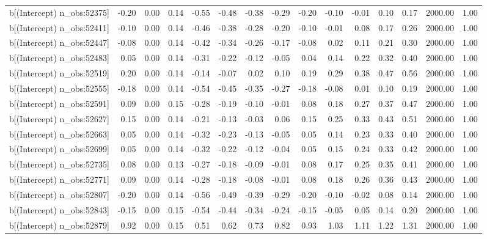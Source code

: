 \begin{table}[ht]
\begin{tabular}{rrrrrrrrrrrrrrr}
  b[(Intercept) n\_obs:52375] & -0.20 & 0.00 & 0.14 & -0.55 & -0.48 & -0.38 & -0.29 & -0.20 & -0.10 & -0.01 & 0.10 & 0.17 & 2000.00 & 1.00 \\ 
  b[(Intercept) n\_obs:52411] & -0.10 & 0.00 & 0.14 & -0.46 & -0.38 & -0.28 & -0.20 & -0.10 & -0.01 & 0.08 & 0.17 & 0.26 & 2000.00 & 1.00 \\ 
  b[(Intercept) n\_obs:52447] & -0.08 & 0.00 & 0.14 & -0.42 & -0.34 & -0.26 & -0.17 & -0.08 & 0.02 & 0.11 & 0.21 & 0.30 & 2000.00 & 1.00 \\ 
  b[(Intercept) n\_obs:52483] & 0.05 & 0.00 & 0.14 & -0.31 & -0.22 & -0.12 & -0.05 & 0.04 & 0.14 & 0.22 & 0.32 & 0.40 & 2000.00 & 1.00 \\ 
  b[(Intercept) n\_obs:52519] & 0.20 & 0.00 & 0.14 & -0.14 & -0.07 & 0.02 & 0.10 & 0.19 & 0.29 & 0.38 & 0.47 & 0.56 & 2000.00 & 1.00 \\ 
  b[(Intercept) n\_obs:52555] & -0.18 & 0.00 & 0.14 & -0.54 & -0.45 & -0.35 & -0.27 & -0.18 & -0.08 & 0.01 & 0.10 & 0.19 & 2000.00 & 1.00 \\ 
  b[(Intercept) n\_obs:52591] & 0.09 & 0.00 & 0.15 & -0.28 & -0.19 & -0.10 & -0.01 & 0.08 & 0.18 & 0.27 & 0.37 & 0.47 & 2000.00 & 1.00 \\ 
  b[(Intercept) n\_obs:52627] & 0.15 & 0.00 & 0.14 & -0.21 & -0.13 & -0.03 & 0.06 & 0.15 & 0.25 & 0.33 & 0.43 & 0.51 & 2000.00 & 1.00 \\ 
  b[(Intercept) n\_obs:52663] & 0.05 & 0.00 & 0.14 & -0.32 & -0.23 & -0.13 & -0.05 & 0.05 & 0.14 & 0.23 & 0.33 & 0.40 & 2000.00 & 1.00 \\ 
  b[(Intercept) n\_obs:52699] & 0.05 & 0.00 & 0.14 & -0.32 & -0.22 & -0.12 & -0.04 & 0.05 & 0.15 & 0.24 & 0.33 & 0.42 & 2000.00 & 1.00 \\ 
  b[(Intercept) n\_obs:52735] & 0.08 & 0.00 & 0.13 & -0.27 & -0.18 & -0.09 & -0.01 & 0.08 & 0.17 & 0.25 & 0.35 & 0.41 & 2000.00 & 1.00 \\ 
  b[(Intercept) n\_obs:52771] & 0.09 & 0.00 & 0.14 & -0.28 & -0.18 & -0.08 & -0.01 & 0.08 & 0.18 & 0.26 & 0.36 & 0.43 & 2000.00 & 1.00 \\ 
  b[(Intercept) n\_obs:52807] & -0.20 & 0.00 & 0.14 & -0.56 & -0.49 & -0.39 & -0.29 & -0.20 & -0.10 & -0.02 & 0.08 & 0.14 & 2000.00 & 1.00 \\ 
  b[(Intercept) n\_obs:52843] & -0.15 & 0.00 & 0.15 & -0.54 & -0.44 & -0.34 & -0.24 & -0.15 & -0.05 & 0.05 & 0.14 & 0.20 & 2000.00 & 1.00 \\ 
  b[(Intercept) n\_obs:52879] & 0.92 & 0.00 & 0.15 & 0.51 & 0.62 & 0.73 & 0.82 & 0.93 & 1.03 & 1.11 & 1.22 & 1.31 & 2000.00 & 1.00 \\ 

\end{tabular}
\end{table}
